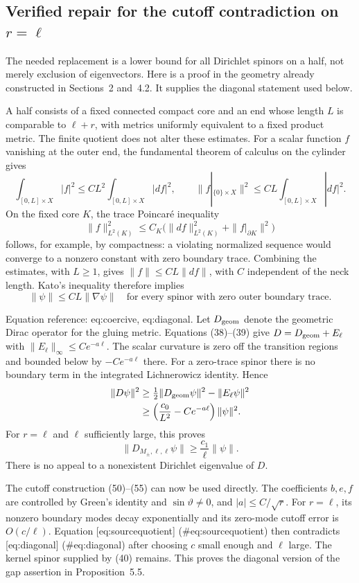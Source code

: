 \documentclass[10pt]{article}
\begin{document}
\subsection*{Verified repair for the cutoff contradiction on \(r=\ell\)}
The needed replacement is a lower bound for all Dirichlet spinors on a half, not merely exclusion of eigenvectors. Here is a proof in the geometry already constructed in Sections 2 and 4.2. It supplies the diagonal statement used below.\par
A half consists of a fixed connected compact core and an end whose length \(L\) is comparable to \(\ell+r\), with metrics uniformly equivalent to a fixed product metric. The finite quotient does not alter these estimates. For a scalar function \(f\) vanishing at the outer end, the fundamental theorem of calculus on the cylinder gives \[\int_{[0,L]\times X}|f|^2
 \leq C L^2\int_{[0,L]\times X}|df|^2,\qquad
 \|f|_{\{0\}\times X}\|^2
 \leq C L\int_{[0,L]\times X}|df|^2.\] On the fixed core \(K\), the trace Poincaré inequality \[\|f\|_{L^2(K)}^2\leq C_K
 \bigl(\|df\|_{L^2(K)}^2+\|f|_{\partial K}\|^2\bigr)\] follows, for example, by compactness: a violating normalized sequence would converge to a nonzero constant with zero boundary trace. Combining the estimates, with \(L\geq1\), gives \(\|f\|\leq C L\|df\|\), with \(C\) independent of the neck length. Kato’s inequality therefore implies \[\|\psi\|\leq C L\|\nabla\psi\|
 \quad\text{for every spinor with zero outer boundary trace.}\]\par
Equation reference: eq:coercive, eq:diagonal. Let \(D_{\rm geom}\) denote the geometric Dirac operator for the gluing metric. Equations (38)–(39) give \(D=D_{\rm geom}+E_\ell\) with \(\|E_\ell\|_\infty\leq C e^{-a\ell}\). The scalar curvature is zero off the transition regions and bounded below by \(-C e^{-a\ell}\) there. For a zero-trace spinor there is no boundary term in the integrated Lichnerowicz identity. Hence \[\begin{aligned}
 \|D\psi\|^2
 &\geq \tfrac12\|D_{\rm geom}\psi\|^2-\|E_\ell\psi\|^2 \notag\\
 &\geq \left(\frac{c_0}{L^2}-C e^{-a\ell}\right)\|\psi\|^2.
 \end{aligned}\] For \(r=\ell\) and \(\ell\) sufficiently large, this proves \[
 \|D_{M_\pm,\ell,\ell}\psi\|
 \geq\frac{c_1}{\ell}\|\psi\|.\] There is no appeal to a nonexistent Dirichlet eigenvalue of \(D\).\par
The cutoff construction (50)–(55) can now be used directly. The coefficients \(b,e,f\) are controlled by Green’s identity and \(\sin\vartheta\ne0\), and \(|a|\leq C/\sqrt r\). For \(r=\ell\), its nonzero boundary modes decay exponentially and its zero-mode cutoff error is \(O(c/\ell)\). Equation [eq:sourcequotient] (\#eq:sourcequotient) then contradicts [eq:diagonal] (\#eq:diagonal) after choosing \(c\) small enough and \(\ell\) large. The kernel spinor supplied by (40) remains. This proves the diagonal version of the gap assertion in Proposition 5.5.\par
\end{document}
